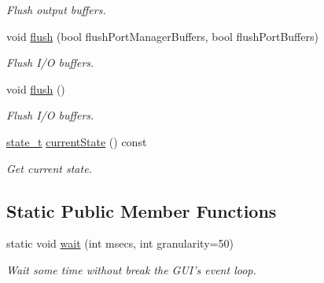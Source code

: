 \begin{DoxyCompactItemize}
\begin{DoxyCompactList}\small\item\em Flush output buffers. \end{DoxyCompactList}\item 
void \hyperlink{classmdt_port_manager_a97b91e7c1641836eb6afb47fd244a18e}{flush} (bool flushPortManagerBuffers, bool flushPortBuffers)
\begin{DoxyCompactList}\small\item\em Flush I/O buffers. \end{DoxyCompactList}\item 
void \hyperlink{classmdt_port_manager_a3eab774008d7530ae341ce9c38265d65}{flush} ()
\begin{DoxyCompactList}\small\item\em Flush I/O buffers. \end{DoxyCompactList}\item 
\hypertarget{classmdt_port_manager_a59241d9e6b6ee71e6c1aeb3e6c0ca81a}{
\hyperlink{classmdt_port_manager_a9448339d7f08ca5e18b904df25b382da}{state\_\-t} \hyperlink{classmdt_port_manager_a59241d9e6b6ee71e6c1aeb3e6c0ca81a}{currentState} () const }
\label{classmdt_port_manager_a59241d9e6b6ee71e6c1aeb3e6c0ca81a}

\begin{DoxyCompactList}\small\item\em Get current state. \end{DoxyCompactList}\end{DoxyCompactItemize}
\subsection*{Static Public Member Functions}
\begin{DoxyCompactItemize}
\item 
static void \hyperlink{classmdt_port_manager_acc5c63ad33fdd3cc153fc23e00c6e69c}{wait} (int msecs, int granularity=50)
\begin{DoxyCompactList}\small\item\em Wait some time without break the GUI's event loop. \end{DoxyCompactList}\end{DoxyCompactItemize}
